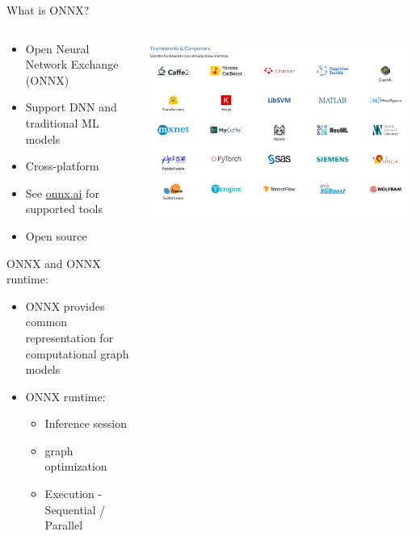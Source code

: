 \documentclass[aspectratio=169,9pt]{beamer}
\begin{document}
\begin{frame}[t]{What is ONNX?}
  \begin{columns}
    \begin{column}{0.5\textwidth}
      \begin{itemize}
        \item Open Neural Network Exchange (ONNX)
        \item Support DNN and traditional ML models
        \item Cross-platform
        \item See \href{https://onnx.ai/supported-tools.html}{\color{blue} onnx.ai} for supported tools
        \item Open source
      \end{itemize}
      \vspace*{1cm}
      ONNX and ONNX runtime:
      \begin{itemize}
        \item ONNX provides common representation for computational graph models
        \item ONNX runtime:
        \begin{itemize}
          \item Inference session
          \item graph optimization
          \item Execution - Sequential / Parallel
        \end{itemize}
      \end{itemize}
    \end{column}
    \begin{column}{0.5\textwidth}
      \includegraphics[width=.9\textwidth]{frameworks_converters.png}
    \end{column}
  \end{columns}
\end{frame}
\end{document}
